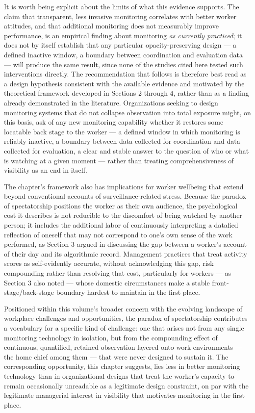 \documentclass[10pt]{article}
\begin{document}
It is worth being explicit about the limits of what this evidence supports. The claim that transparent, less invasive monitoring correlates with better worker attitudes, and that additional monitoring does not measurably improve performance, is an empirical finding about monitoring \emph{as currently practiced}; it does not by itself establish that any particular opacity-preserving design --- a defined inactive window, a boundary between coordination and evaluation data --- will produce the same result, since none of the studies cited here tested such interventions directly. The recommendation that follows is therefore best read as a design hypothesis consistent with the available evidence and motivated by the theoretical framework developed in Sections 2 through 4, rather than as a finding already demonstrated in the literature. Organizations seeking to design monitoring systems that do not collapse observation into total exposure might, on this basis, ask of any new monitoring capability whether it restores some locatable back stage to the worker --- a defined window in which monitoring is reliably inactive, a boundary between data collected for coordination and data collected for evaluation, a clear and stable answer to the question of who or what is watching at a given moment --- rather than treating comprehensiveness of visibility as an end in itself.

The chapter's framework also has implications for worker wellbeing that extend beyond conventional accounts of surveillance-related stress. Because the paradox of spectatorship positions the worker as their own audience, the psychological cost it describes is not reducible to the discomfort of being watched by another person; it includes the additional labor of continuously interpreting a datafied reflection of oneself that may not correspond to one's own sense of the work performed, as Section 3 argued in discussing the gap between a worker's account of their day and its algorithmic record. Management practices that treat activity scores as self-evidently accurate, without acknowledging this gap, risk compounding rather than resolving that cost, particularly for workers --- as Section 3 also noted --- whose domestic circumstances make a stable front-stage/back-stage boundary hardest to maintain in the first place.

Positioned within this volume's broader concern with the evolving landscape of workplace challenges and opportunities, the paradox of spectatorship contributes a vocabulary for a specific kind of challenge: one that arises not from any single monitoring technology in isolation, but from the compounding effect of continuous, quantified, retained observation layered onto work environments --- the home chief among them --- that were never designed to sustain it. The corresponding opportunity, this chapter suggests, lies less in better monitoring technology than in organizational designs that treat the worker's capacity to remain occasionally unreadable as a legitimate design constraint, on par with the legitimate managerial interest in visibility that motivates monitoring in the first place.
\end{document}
